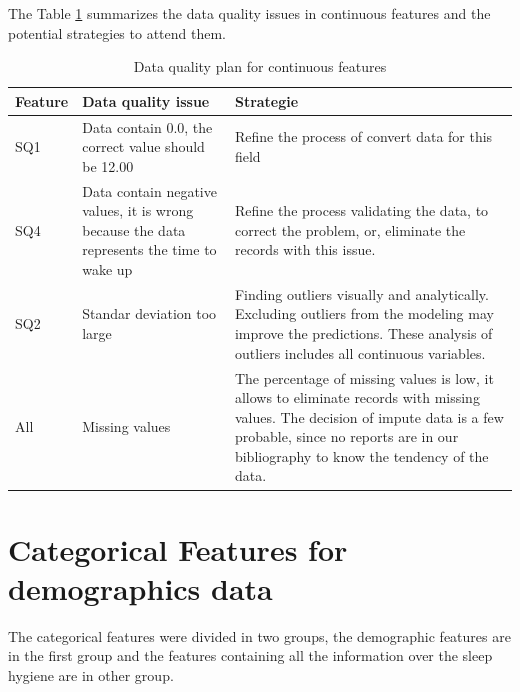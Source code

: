 \documentclass[]{book}
\begin{document}
The Table \ref{tab-data-quality-plan-continuous} summarizes the data
quality issues in continuous features and the potential strategies to
attend them.

\begin{table}[ht]
\centering
\caption{Data quality plan for continuous features}
\label{tab-data-quality-plan-continuous}
\begin{tabular}{|l|p{5cm}|p{8cm}|}
\hline
Feature & Data quality issue  & Strategie \\ \hline
SQ1     & Data contain 0.0, the correct value should be 12.00 & Refine the process of convert data for this field  \\ \hline
SQ4     & Data contain negative values, it is wrong because the data represents the time to wake up & Refine the process validating the data, to correct the problem, or, eliminate the records with this issue. \\ \hline
SQ2     & Standar deviation too large & Finding outliers visually and analytically. Excluding outliers from the modeling may improve the predictions. These analysis of outliers includes all continuous variables.  \\ \hline
All     & Missing values  & The percentage of missing values is low, it allows to eliminate records with missing values. The decision of impute data is a few probable, since no reports are in our bibliography to know the tendency of the data. \\ \hline
\end{tabular}
\end{table}

\section{Categorical Features for demographics
data}\label{categorical-features-for-demographics-data}

The categorical features were divided in two groups, the demographic
features are in the first group and the features containing all the
information over the sleep hygiene are in other group.
\end{document}
